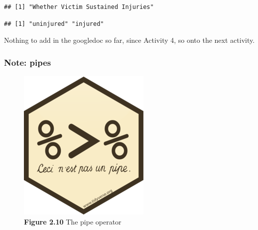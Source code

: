 \documentclass[
]{book}
\newenvironment{Shaded}{\begin{snugshade}}{\end{snugshade}}
\newcommand{\AttributeTok}[1]{\textcolor[rgb]{0.77,0.63,0.00}{#1}}
\newcommand{\CommentTok}[1]{\textcolor[rgb]{0.56,0.35,0.01}{\textit{#1}}}
\newcommand{\DecValTok}[1]{\textcolor[rgb]{0.00,0.00,0.81}{#1}}
\newcommand{\FunctionTok}[1]{\textcolor[rgb]{0.00,0.00,0.00}{#1}}
\newcommand{\NormalTok}[1]{#1}
\newcommand{\OtherTok}[1]{\textcolor[rgb]{0.56,0.35,0.01}{#1}}
\newcommand{\SpecialCharTok}[1]{\textcolor[rgb]{0.00,0.00,0.00}{#1}}
\newcommand{\StringTok}[1]{\textcolor[rgb]{0.31,0.60,0.02}{#1}}
\begin{document}
\begin{verbatim}
## [1] "Whether Victim Sustained Injuries"
\end{verbatim}

\begin{Shaded}
\end{Shaded}

\begin{verbatim}
## [1] "uninjured" "injured"
\end{verbatim}

Nothing to add in the googledoc so far, since Activity 4, so onto the next activity.

\hypertarget{note-pipes}{%
\subsubsection{Note: pipes}\label{note-pipes}}

\begin{figure}
\centering
\includegraphics{Images/logo_pipe.png}
\caption{\textbf{Figure 2.10} The pipe operator}
\end{figure}
\end{document}
